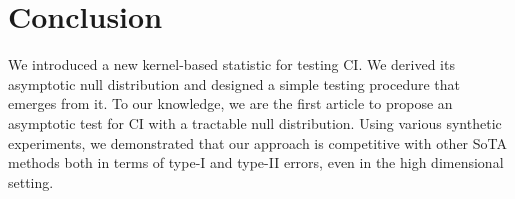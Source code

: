 \section{Conclusion}
We introduced a new kernel-based statistic for testing CI. We derived its asymptotic null distribution and designed a simple testing procedure that emerges from it. To our knowledge, we are the first article to propose an asymptotic test for CI with a tractable null distribution. Using various synthetic experiments, we demonstrated that our approach is competitive with other SoTA methods both in terms of type-I and type-II errors, even in the high dimensional setting.







